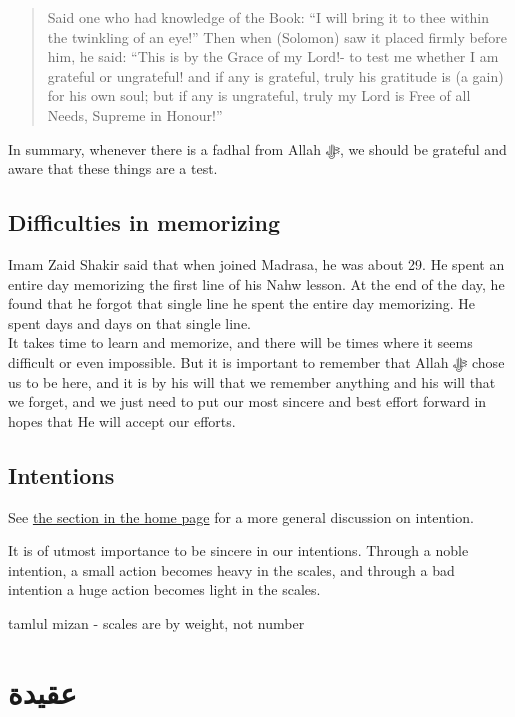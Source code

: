 \documentclass[]{book}
\begin{document}
\begin{quote}
Said one who had knowledge of the Book: ``I will bring it to thee within the twinkling of an eye!'' Then when (Solomon) saw it placed firmly before him, he said: ``This is by the Grace of my Lord!- to test me whether I am grateful or ungrateful! and if any is grateful, truly his gratitude is (a gain) for his own soul; but if any is ungrateful, truly my Lord is Free of all Needs, Supreme in Honour!''
\end{quote}

In summary, whenever there is a fadhal from Allah ﷻ, we should be grateful and aware that these things are a test.

\hypertarget{difficulties-in-memorizing}{%
\section{Difficulties in memorizing}\label{difficulties-in-memorizing}}

Imam Zaid Shakir said that when joined Madrasa, he was about 29. He spent an entire day memorizing the first line of his Nahw lesson. At the end of the day, he found that he forgot that single line he spent the entire day memorizing. He spent days and days on that single line.\\
It takes time to learn and memorize, and there will be times where it seems difficult or even impossible. But it is important to remember that Allah ﷻ chose us to be here, and it is by his will that we remember anything and his will that we forget, and we just need to put our most sincere and best effort forward in hopes that He will accept our efforts.

\hypertarget{intentions}{%
\section{Intentions}\label{intentions}}

See \protect\hyperlink{intent}{the section in the home page} for a more general discussion on intention.

It is of utmost importance to be sincere in our intentions. Through a noble intention, a small action becomes heavy in the scales, and through a bad intention a huge action becomes light in the scales.

tamlul mizan - scales are by weight, not number

\hypertarget{aqeedah}{%
\chapter{عقيدة}\label{aqeedah}}
\end{document}

